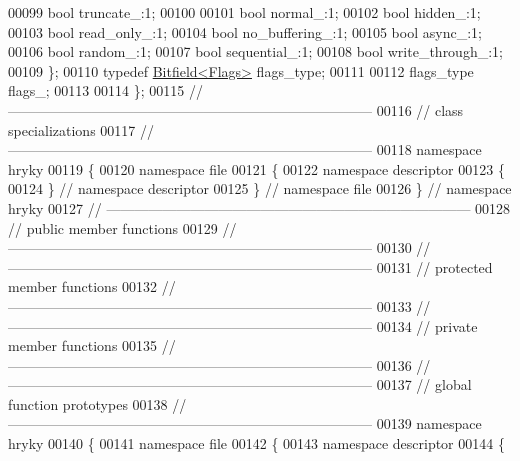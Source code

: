 \begin{DoxyCode}
00099         \textcolor{keywordtype}{bool} truncate\_:1;
00100 
00101         \textcolor{keywordtype}{bool} normal\_:1;
00102         \textcolor{keywordtype}{bool} hidden\_:1;
00103         \textcolor{keywordtype}{bool} read\_only\_:1;
00104         \textcolor{keywordtype}{bool} no\_buffering\_:1;
00105         \textcolor{keywordtype}{bool} async\_:1;
00106         \textcolor{keywordtype}{bool} random\_:1;
00107         \textcolor{keywordtype}{bool} sequential\_:1;
00108         \textcolor{keywordtype}{bool} write\_through\_:1;
00109     \};
00110     \textcolor{keyword}{typedef} \hyperlink{classhryky_1_1_bitfield}{Bitfield<Flags>} flags\_type;
00111 
00112     flags\_type flags\_;
00113 
00114 \};
00115 \textcolor{comment}{//
      ------------------------------------------------------------------------------}
00116 \textcolor{comment}{// class specializations}
00117 \textcolor{comment}{//
      ------------------------------------------------------------------------------}
00118 \textcolor{keyword}{namespace }hryky
00119 \{
00120 \textcolor{keyword}{namespace }file
00121 \{
00122 \textcolor{keyword}{namespace }descriptor
00123 \{
00124 \} \textcolor{comment}{// namespace descriptor}
00125 \} \textcolor{comment}{// namespace file}
00126 \} \textcolor{comment}{// namespace hryky}
00127 \textcolor{comment}{//
      ------------------------------------------------------------------------------}
00128 \textcolor{comment}{// public member functions}
00129 \textcolor{comment}{//
      ------------------------------------------------------------------------------}
00130 \textcolor{comment}{//
      ------------------------------------------------------------------------------}
00131 \textcolor{comment}{// protected member functions}
00132 \textcolor{comment}{//
      ------------------------------------------------------------------------------}
00133 \textcolor{comment}{//
      ------------------------------------------------------------------------------}
00134 \textcolor{comment}{// private member functions}
00135 \textcolor{comment}{//
      ------------------------------------------------------------------------------}
00136 \textcolor{comment}{//
      ------------------------------------------------------------------------------}
00137 \textcolor{comment}{// global function prototypes}
00138 \textcolor{comment}{//
      ------------------------------------------------------------------------------}
00139 \textcolor{keyword}{namespace }hryky
00140 \{
00141 \textcolor{keyword}{namespace }file
00142 \{
00143 \textcolor{keyword}{namespace }descriptor
00144 \{

\end{DoxyCode}
